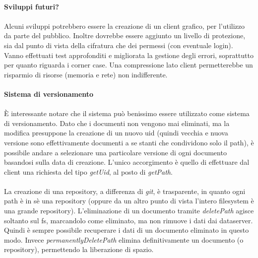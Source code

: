\documentclass[11pt,a4paper,english]{article}
\begin{document}
\paragraph{Sviluppi futuri?}

\paragraph{} Alcuni sviluppi potrebbero essere la creazione di un client grafico, per l'utilizzo da parte del pubblico. Inoltre dovrebbe essere aggiunto un livello di protezione, sia dal punto di vista della cifratura che dei permessi (con eventuale login). Vanno effettuati test approfonditi e migliorata la gestione degli errori, soprattutto per quanto riguarda i corner case. Una compressione lato client permetterebbe un risparmio di risorse (memoria e rete) non indifferente. 

\paragraph{Sistema di versionamento}

\paragraph{} È interessante notare che il sistema può benissimo essere utilizzato come sistema di versionamento. Dato che i documenti non vengono mai eliminati, ma la modifica presuppone la creazione di un nuovo uid (quindi vecchia e nuova versione sono effettivamente documenti a se stanti che condividono solo il path), è possibile andare a selezionare una particolare versione di ogni documento basandosi sulla data di creazione. L'unico accorgimento è quello di effettuare dal client una richiesta del tipo \emph{getUid}, al posto di \emph{getPath}.

\paragraph{} La creazione di una repository, a differenza di \emph{git}, è trasparente, in quanto ogni path è in sè una repository (oppure da un altro punto di vista l'intero filesystem è una grande repository). L'eliminazione di un documento tramite \emph{deletePath} agisce soltanto sul fs, marcandolo come eliminato, ma non rimuove i dati dai dataserver. Quindi è sempre possibile recuperare i dati di un documento eliminato in questo modo. Invece \emph{permanentlyDeletePath} elimina definitivamente un documento (o repository), permettendo la liberazione di spazio. 
\end{document}
